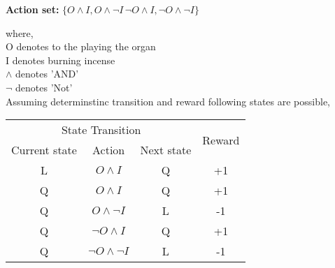 \documentclass[addpoints,12pt,solution]{exam}
\begin{document}
\begin{questions}
\begin{enumerate}[label=(\alph*)]
\begin{solution}
\textbf{Action set:} $\{O\wedge I,O\wedge \neg I\, \neg O \wedge I, \neg O \wedge \neg I \}$

where,\\
O denotes to the playing the organ  \\
I denotes burning incense \\
$\wedge$ denotes 'AND' \\
$\neg$ denotes 'Not' \\

Assuming determinstinc transition and reward following states are possible,\\

	\begin{tabular}{cccc}
			\hline
			\multicolumn{3}{|c|}{State Transition}                                                              & \multicolumn{1}{c|}{\multirow{2}{*}{Reward}} \\ \cline{1-3}
			\multicolumn{1}{|c|}{Current state} & \multicolumn{1}{c|}{Action} & \multicolumn{1}{c|}{Next state} & \multicolumn{1}{c|}{}                        \\ \hline
			\multicolumn{1}{|c|}{L}              & \multicolumn{1}{c|}{$ O\wedge I$}       & \multicolumn{1}{c|}{Q}           & \multicolumn{1}{c|}{+1}                        \\ \hline
			\multicolumn{1}{|c|}{Q}              & \multicolumn{1}{c|}{$O\wedge I$ }       & \multicolumn{1}{c|}{Q}           & \multicolumn{1}{c|}{+1}                        \\ \hline
			\multicolumn{1}{|c|}{Q}              & \multicolumn{1}{c|}{$O\wedge \neg I$}       & \multicolumn{1}{c|}{L}           & \multicolumn{1}{c|}{-1}                        \\ \hline
			\multicolumn{1}{|c|}{Q}              & \multicolumn{1}{c|}{$\neg O \wedge I$}       & \multicolumn{1}{c|}{Q}           & \multicolumn{1}{c|}{+1}                        \\ \hline
			\multicolumn{1}{|c|}{Q}                & \multicolumn{1}{c|}{$\neg O \wedge \neg I$}        & \multicolumn{1}{|c|}{L}            & \multicolumn{1}{c|}{-1}           \\ \hline             
		\end{tabular}

\end{solution}


\end{enumerate}
\end{questions}
\end{document}
